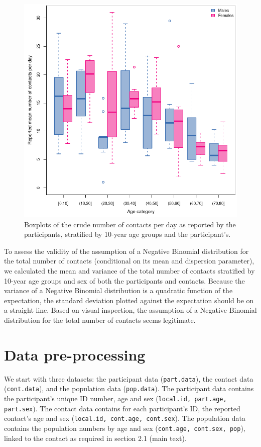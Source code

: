 \documentclass[aoas,preprint]{imsart}
\numberwithin{equation}{section}
\begin{document}
\begin{figure}
\centering
\includegraphics{fig_mean_number_of_contacts.pdf}
\caption{Boxplots of the crude number of contacts per day as reported by the participants, stratified by 10-year age groups and the participant's.}
\end{figure}

To assess the validity of the assumption of a Negative Binomial distribution for the total number of contacts (conditional on its mean and dispersion parameter), we calculated the mean and variance of the total number of contacts stratified by 10-year age groups and sex of both the participants and contacts. Because the variance of a Negative Binomial distribution is a quadratic function of the expectation, the standard deviation plotted against the expectation should be on a straight line. Based on visual inspection, the assumption of a Negative Binomial distribution for the total number of contacts seems legitimate.

\section{Data pre-processing}

We start with three datasets: the participant data (\texttt{part.data}), the contact data (\texttt{cont.data}), and the population data (\texttt{pop.data}). The participant data contains the participant's unique ID number, age and sex (\texttt{local.id, part.age, part.sex}). The contact data contains for each participant's ID, the reported contact's age and sex (\texttt{local.id, cont.age, cont.sex}). The population data contains the population numbers by age and sex (\texttt{cont.age, cont.sex, pop}), linked to the contact as required in section 2.1 (main text).
\end{document}
